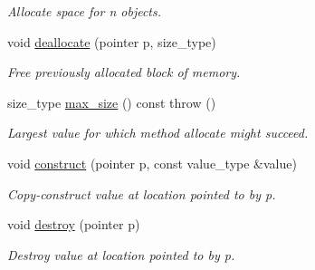 \begin{DoxyCompactItemize}
\begin{DoxyCompactList}\small\item\em Allocate space for n objects. \end{DoxyCompactList}\item 
\hypertarget{classtbb_1_1interface6_1_1memory__pool__allocator_a9fcf288f2d653972d1bdc0c65abebed4}{}void \hyperlink{classtbb_1_1interface6_1_1memory__pool__allocator_a9fcf288f2d653972d1bdc0c65abebed4}{deallocate} (pointer p, size\+\_\+type)\label{classtbb_1_1interface6_1_1memory__pool__allocator_a9fcf288f2d653972d1bdc0c65abebed4}

\begin{DoxyCompactList}\small\item\em Free previously allocated block of memory. \end{DoxyCompactList}\item 
\hypertarget{classtbb_1_1interface6_1_1memory__pool__allocator_a2bded8e3fb2cec32b48771e7a1bbb838}{}size\+\_\+type \hyperlink{classtbb_1_1interface6_1_1memory__pool__allocator_a2bded8e3fb2cec32b48771e7a1bbb838}{max\+\_\+size} () const   throw ()\label{classtbb_1_1interface6_1_1memory__pool__allocator_a2bded8e3fb2cec32b48771e7a1bbb838}

\begin{DoxyCompactList}\small\item\em Largest value for which method allocate might succeed. \end{DoxyCompactList}\item 
\hypertarget{classtbb_1_1interface6_1_1memory__pool__allocator_affac76f7742c4d8ea6345e0aad82792a}{}void \hyperlink{classtbb_1_1interface6_1_1memory__pool__allocator_affac76f7742c4d8ea6345e0aad82792a}{construct} (pointer p, const value\+\_\+type \&value)\label{classtbb_1_1interface6_1_1memory__pool__allocator_affac76f7742c4d8ea6345e0aad82792a}

\begin{DoxyCompactList}\small\item\em Copy-\/construct value at location pointed to by p. \end{DoxyCompactList}\item 
\hypertarget{classtbb_1_1interface6_1_1memory__pool__allocator_a2223b6469f88aadc432a4b3f88728d0f}{}void \hyperlink{classtbb_1_1interface6_1_1memory__pool__allocator_a2223b6469f88aadc432a4b3f88728d0f}{destroy} (pointer p)\label{classtbb_1_1interface6_1_1memory__pool__allocator_a2223b6469f88aadc432a4b3f88728d0f}

\begin{DoxyCompactList}\small\item\em Destroy value at location pointed to by p. \end{DoxyCompactList}\end{DoxyCompactItemize}
